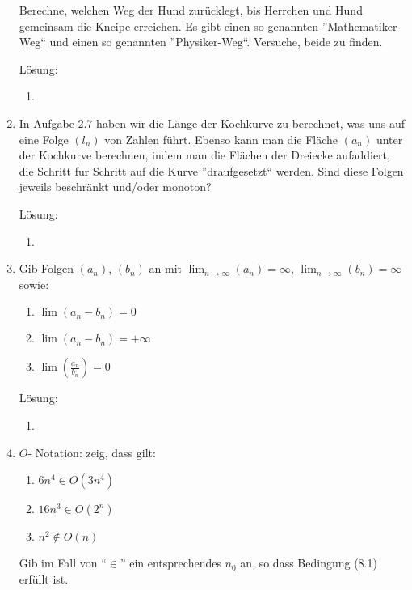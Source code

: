 \documentclass[main.tex]{subfiles}
\begin{document}
\begin{enumerate}
	      Berechne, welchen Weg der Hund zurücklegt, bis Herrchen und Hund gemeinsam die Kneipe erreichen.
	      Es gibt einen so genannten ”Mathematiker-Weg“ und einen so genannten
	      ”Physiker-Weg“. Versuche, beide zu finden.
          
          Lösung:
          \begin{enumerate}
              \item 
          \end{enumerate}
	\item  In Aufgabe \( 2.7 \) haben wir die Länge der Kochkurve zu berechnet, was uns auf
	      eine Folge \( (l_n) \) von Zahlen führt. Ebenso kann man die Fläche \( (a_n) \) unter der
	      Kochkurve berechnen, indem man die Flächen der Dreiecke aufaddiert, die
	      Schritt fur Schritt auf die Kurve ”draufgesetzt“ werden.
	      Sind diese Folgen jeweils beschränkt und/oder monoton?
          
          Lösung:
          \begin{enumerate}
              \item 
          \end{enumerate}
	\item Gib Folgen \( (a_n) \), \( (b_n) \) an mit \( \lim_{n \to \infty}(a_n) = \infty \),
	      \( \lim_{n \to \infty}(b_n) = \infty \) sowie:
	      \begin{enumerate}
		      \item \( \lim(a_n - b_n) = 0 \)
		      \item \( \lim(a_n - b_n) = + \infty \)
		      \item \( \lim( \frac{a_n}{b_n}) = 0 \)
	      \end{enumerate}
          
          Lösung:
          \begin{enumerate}
              \item 
          \end{enumerate}
	\item \( O \)- Notation: zeig, dass gilt:
	      \begin{enumerate}
		      \item \( 6n^4  \in O(3n^4) \)
		      \item \( 16n^3 \in O(2^n) \)
		      \item \( n^2 \notin O(n) \)
	      \end{enumerate}
	      Gib im Fall von "`\( \in \)"' ein entsprechendes \( n_0 \) an, so dass Bedingung
	      (8.1) erfüllt ist.
          

\end{enumerate}
\end{document}
